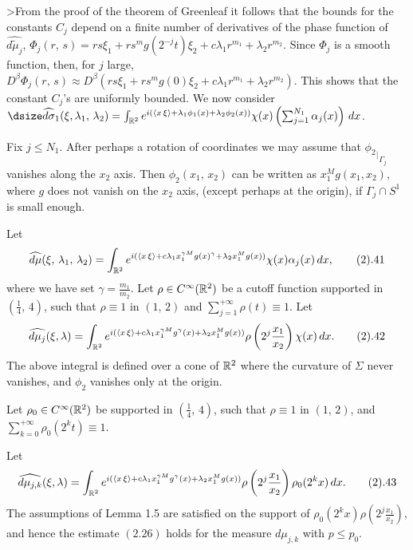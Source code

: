 >From the proof of the theorem of Greenleaf it follows that the bounds for the 
constants $C_j$  depend on a finite number of  derivatives of the phase 
function of $\widehat{d\tilde\mu_j}$,  $\Phi_j(r,\,s)=
rs\xi_1 + rs^mg(2^{-j}t)\xi_2 +c\lambda_1 r^{m_1}  +\lambda_2 r^{m_2}$.
Since $\Phi_j$ is a smooth function, then, for $j$ large,  
$D^\beta\Phi_j(r,\,s) \approx
D^\beta(rs\xi_1 + rs^mg(0)\xi_2 +c\lambda_1 r^{m_1}  +\lambda_2 r^{m_2})$.
This shows that the constant $C_j$'s are uniformly 
bounded.
\bigskip
We now consider  $\dsize
\widehat{d\sigma}_1(\xi,\lambda_1,\,\lambda_2) =\int_{{\Bbb R}^2} 
e^{i(\langle x\,\xi\rangle+\lambda_1\phi_1(x)+\lambda_2\phi_2(x))}
\chi(x) \left(\sum_{j=1}^{N_1}
\alpha_j(x)\right) \,dx $.
\par
Fix  $j\leq N_1$. After perhaps a 
rotation of coordinates we may assume that  
${{\phi_2}_|}_{\Gamma_j}$ vanishes along the $x_2$ axis.
Then 
$\phi_2(x_1,\, x_2)$ can be  written as $ x_1^Mg(x_1,x_2)$, where 
$g$  does not vanish on the $x_2$ axis, (except perhaps at the origin), 
if  $\Gamma_j\cap S^1$ is  small enough.
\par
Let
$$\widehat{d\mu}(\xi,\,\lambda_1,\,\lambda_2)=\int_{{\Bbb R}^2} e^{i(
\langle x\,\xi\rangle+c\lambda_1x_1^{\gamma M}g(x)^\gamma+
\lambda_2x_1^{M}g(x))}
\chi(x) \alpha_j(x) \,dx,
\tag 2.41
$$
where we have set $\gamma =\frac{m_1}{m_2}$.
Let $\rho\in C^{\infty}({\Bbb R}^2)$ 
be a cutoff  function  supported in $(\frac{1}{4}, \, 4)$, 
such that $\rho\equiv 1 $ in $(1,\, 2)$ and  
$\sum_{j=1}^{+\infty}\rho(t)\equiv 1$. Let 
$$
\widehat{d\mu_j}(\xi,\lambda)=\int_{{\Bbb R}^2} e^{i(
\langle x\,\xi\rangle+
c\lambda_1x_1^{\gamma M}g^\gamma(x)+\lambda_2x_1^{M }g(x))}
\rho\left(2^{j}\frac{x_1}{x_2}\right) \chi(x)\,dx.
\tag 2.42
$$
The above integral   
is  defined over a cone of ${\Bbb R}^2$  where the curvature of $\Sigma$
never vanishes, and $\phi_2$ vanishes only at the origin.  
\par
Let $\rho_0\in C^{\infty}({\Bbb R}^2)$  be  supported in  
$(\frac{1}{4},\,4)$, such that  $\rho \equiv 1$ in $(1,\,2)$,
and $\sum_{k =0}^{+\infty} \rho_0(2^kt) \equiv 1$.

Let
$$
\widehat{d\mu_{j,k}}(\xi,\lambda)=\int_{{\Bbb R}^2} e^{i(
\langle x\,\xi\rangle+
c\lambda_1x_1^{\gamma M}g^\gamma(x)+\lambda_2x_1^{M }g(x))}
\rho\left(2^{j}\frac{x_1}{x_2}\right) \rho_0(2^kx)\,dx.
\tag 2.43
$$
The assumptions of Lemma 1.5 are satisfied on the support of 
$\rho_0(2^kx)\rho\left( 2^j \frac{x_1}{x_2}\right)$,  and hence 
the estimate $(2.26)$ holds for 
the measure $d\mu_{j,k}$ with $p\leq p_0$. 

